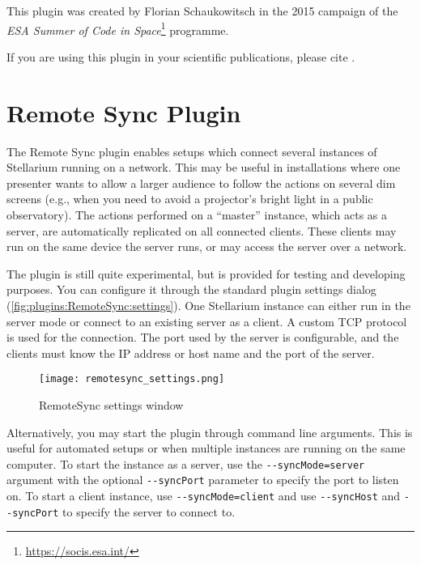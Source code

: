 This plugin was created by Florian Schaukowitsch in the 2015 campaign of the 
\emph{ESA Summer of Code in Space}\footnote{\url{https://socis.esa.int/}} programme. 

If you are using this plugin in your scientific publications, please cite \citet{Zotti-etal:SEAC2016}.

\newpage
\section{Remote Sync Plugin}
\label{sec:plugin:RemoteSync}

The Remote Sync plugin enables setups which connect several instances of
Stellarium running on a network. This may be useful in installations where one
presenter wants to allow a larger audience to follow the actions on several
dim screens (e.g., when you need to avoid a projector's bright light in a 
public observatory). The actions 
performed on a ``master'' instance, which acts as a server, are automatically 
replicated on all connected clients. These clients may run on the same device 
the server runs, or may access the server over a network.

The plugin is still quite experimental, but is provided for testing and developing purposes.
You can configure it through the standard plugin settings dialog 
(\autoref{fig:plugins:RemoteSync:settings}). One Stellarium instance
can either run in the server mode or connect to an existing server as a client.
A custom TCP protocol is used for the connection. The port used by the server is
configurable, and the clients must know the IP address or host name and the port
of the server.

\begin{figure}[htb]
	\centering\texttt{[image: remotesync\_settings.png]}
	\caption{RemoteSync settings window}
	\label{fig:plugins:RemoteSync:settings}
\end{figure}

Alternatively, you may start the plugin through command line arguments. This is
useful for automated setups or when multiple instances are running on the same
computer. To start the instance as a server, use the
\texttt{-{}-syncMode=server} argument with the optional \texttt{-{}-syncPort}
parameter to specify the port to listen on. To start a client instance, use
\texttt{-{}-syncMode=client} and use \texttt{-{}-syncHost} and
\texttt{-{}-syncPort} to specify the server to connect to.

